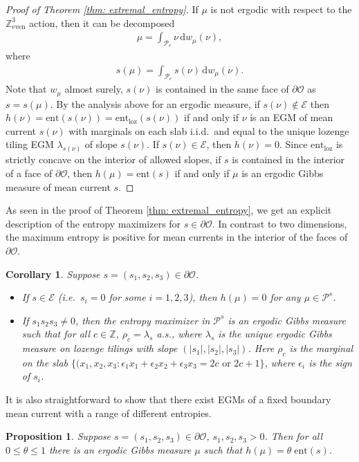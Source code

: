 \documentclass[11pt]{article}
\newtheorem{prop}[thm]{Proposition}
\newtheorem{cor}[thm]{Corollary}
\theoremstyle{remark}
\theoremstyle{definition}
\newcommand{\Z}{\mathbb{Z}}
\newcommand{\ent}{\text{ent}}
\newcommand{\threeeven}{\Z^3_{\text{even}}}
\newcommand{\mc}[1]{\mathcal{#1}}
\newcommand{\m}[1]{\mathbb{#1}}
\newcommand{\dd}{\mathrm{d}}
\begin{document}
\begin{proof}[Proof of Theorem \ref{thm: extremal_entropy}]
If $\mu$ is not ergodic with respect to the $\threeeven$ action, then it can be decomposed 
\begin{align*}
    \mu = \int_{\mc P_e} \nu \, \dd w_\mu(\nu),
\end{align*}
where 
\begin{align*}
    s(\mu) = \int_{\mc P_e} s(\nu) \, \dd w_\mu(\nu).
\end{align*}
Note that $w_\mu$ almost surely, $s(\nu)$ is contained in the same face of $\partial \mc O$ as $s=s(\mu)$. By the analysis above for an ergodic measure, if $s(\nu)\not\in \mc E$ then $h(\nu) = \ent(s(\nu)) = \ent_{\text{loz}}(s(\nu))$ if and only if $\nu$ is an EGM of mean current $s(\nu)$ with marginals on each slab i.i.d.\ and equal to the unique lozenge tiling EGM $\lambda_{s(\nu)}$ of slope $s(\nu)$. If $s(\nu)\in \mc E$, then $h(\nu) =0$. Since $\ent_{\text{loz}}$ is strictly concave on the interior of allowed slopes, if $s$ is contained in the interior of a face of $\partial \mc O$, then $h(\mu) = \ent(s)$ if and only if $\mu$ is an ergodic Gibbs measure of mean current $s$. 
\end{proof}

As seen in the proof of Theorem \ref{thm: extremal_entropy}, we get an explicit description of the entropy maximizers for $s\in \partial \mc O$. In contrast to two dimensions, the maximum entropy is positive for mean currents in the interior of the faces of $\partial \mc O$.
\begin{cor} \label{Corollary: entropy maximiser}
    Suppose $s=(s_1,s_2,s_3)\in \partial \mc O$. 
    \begin{itemize}
        \item If $s\in \mc E$ (i.e.\ $s_i=0$ for some $i=1,2,3$), then $h(\mu) = 0$ for any $\mu \in \mc P^s$.
        \item If $s_1s_2s_3\neq 0$, then the entropy maximizer in $\mc P^s$ is an ergodic Gibbs measure such that for all $c\in \m Z$, $\rho_c=\lambda_s$ a.s., where $\lambda_s$ is the unique ergodic Gibbs measure on lozenge tilings with slope $(|s_1|,|s_2|,|s_3|)$. Here $\rho_c$ is the marginal on the slab $\{(x_1,x_2,x_3 : \epsilon_1 x_1 + \epsilon_2 x_2 + \epsilon_3 x_3 = 2c \text{ or }2c+1\}$, where $\epsilon_i$ is the sign of $s_i$.
    \end{itemize}
\end{cor}

It is also straightforward to show that there exist EGMs of a fixed boundary mean current with a range of different entropies. 
\begin{prop}\label{prop: same current different entropy}
	Suppose $s=(s_1,s_2,s_3)\in \partial \mc O$, $s_1,s_2,s_3>0$. Then for all $0\leq \theta\leq 1$ there is an ergodic Gibbs measure $\mu$ such that $h(\mu)=\theta\;\ent(s)$.
\end{prop}
\end{document}
